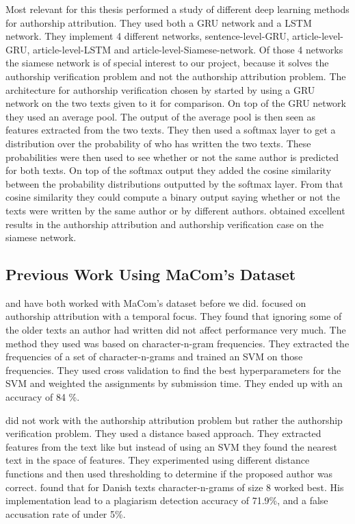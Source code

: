 Most relevant for this thesis \citet{qian:2018} performed a study of different
deep learning methods for authorship attribution. They used both a \gls{GRU}
network and a \gls{LSTM} network. They implement 4 different networks,
sentence-level-\gls{GRU}, article-level-\gls{GRU}, article-level-\gls{LSTM} and
article-level-Siamese-network. Of those 4 networks the siamese network is of
special interest to our project, because it solves the authorship verification
problem and not the authorship attribution problem. The architecture for
authorship verification chosen by \citet{qian:2018} started by using a \gls{GRU}
network on the two texts given to it for comparison. On top of the \gls{GRU}
network they used an average pool. The output of the average pool is then seen
as features extracted from the two texts. They then used a softmax layer to get
a distribution over the probability of who has written the two texts. These
probabilities were then used to see whether or not the same author is predicted
for both texts. On top of the softmax output they added the cosine similarity
between the probability distributions outputted by the softmax layer. From that
cosine similarity they could compute a binary output saying whether or not the
texts were written by the same author or by different authors. \citet{qian:2018}
obtained excellent results in the authorship attribution and authorship
verification case on the siamese network.


\subsection{Previous Work Using MaCom's Dataset}
\label{subsec:previous_work_using_macoms_dataset}

\citet{hansen2014} and \citet{aalykke2016} have both worked with MaCom's dataset
before we did. \citet{hansen2014} focused on authorship attribution with a
temporal focus. They found that ignoring some of the older texts an author had
written did not affect performance very much. The method they used was based
on character-n-gram frequencies. They extracted the frequencies of a set of
character-n-grams and trained an \gls{SVM} on those frequencies. They used cross
validation to find the best hyperparameters for the \gls{SVM} and weighted the
assignments by submission time. They ended up with an accuracy of 84 \%.

\citet{aalykke2016} did not work with the authorship attribution problem but
rather the authorship verification problem. They used a distance based approach.
They extracted features from the text like \citet{hansen2014} but instead of
using an \gls{SVM} they found the nearest text in the space of features. They
experimented using different distance functions and then used thresholding to
determine if the proposed author was correct. \citet{aalykke2016} found that for
Danish texts character-n-grams of size 8 worked best. His implementation lead to
a plagiarism detection accuracy of 71.9\%, and a false accusation rate of under
5\%.

